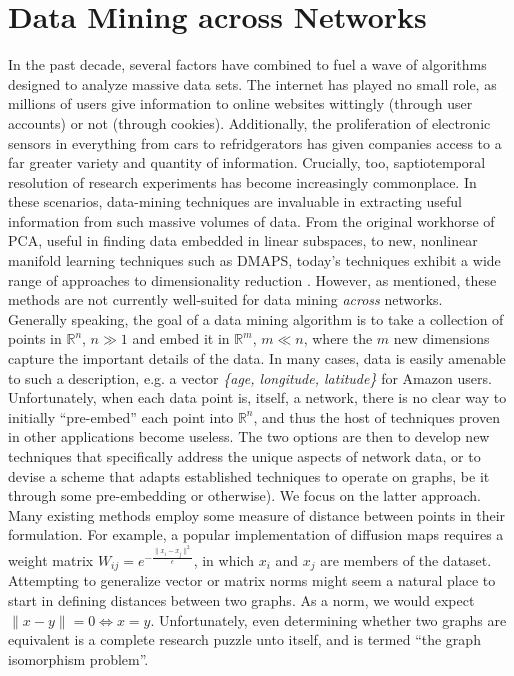 \documentclass[11pt]{article}
\begin{document}
\section{Data Mining across Networks}
In the past decade, several factors have combined to fuel a wave of algorithms designed to analyze massive data sets. The internet has played no small role, as millions of users give information to online websites wittingly (through user accounts) or not (through cookies). Additionally, the proliferation of electronic sensors in everything from cars to refridgerators has given companies access to a far greater variety and quantity of information. Crucially, too, saptiotemporal resolution of research experiments has become increasingly commonplace. In these scenarios, data-mining techniques are invaluable in extracting useful information from such massive volumes of data. From the original workhorse of PCA, useful in finding data embedded in linear subspaces, to new, nonlinear manifold learning techniques such as DMAPS, today's techniques exhibit a wide range of approaches to dimensionality reduction \cite{data mining papers}. However, as mentioned, these methods are not currently well-suited for data mining \textit{across} networks. \vspace{1mm}\\ 
Generally speaking, the goal of a data mining algorithm is to take a collection of points in $\mathbb{R}^{n}$, $n\gg1$ and embed it in $\mathbb{R}^{m}$, $m \ll n$, where the $m$ new dimensions capture the important details of the data. In many cases, data is easily amenable to such a description, e.g. a vector \textit{\{age, longitude, latitude\}} for Amazon users. Unfortunately, when each data point is, itself, a network, there is no clear way to initially ``pre-embed'' each point into $\mathbb{R}^{n}$, and thus the host of techniques proven in other applications become useless. The two options are then to develop new techniques that specifically address the unique aspects of network data, or to devise a scheme that adapts established techniques to operate on graphs, be it through some pre-embedding or otherwise). We focus on the latter approach. \vspace{1mm}\\
Many existing methods employ some measure of distance between points in their formulation. For example, a popular implementation of diffusion maps requires a weight matrix $W_{ij}=e^{-\frac{\|x_{i}-x_{j}\|^{2}}{\epsilon}}$, in which $x_{i}$ and $x_{j}$ are members of the dataset. Attempting to generalize vector or matrix norms might seem a natural place to start in defining distances between two graphs. As a norm, we would expect $\| x - y \| = 0 \Leftrightarrow x = y$. Unfortunately, even determining whether two graphs are equivalent is a complete research puzzle unto itself, and is termed ``the graph isomorphism problem''.
\end{document}
